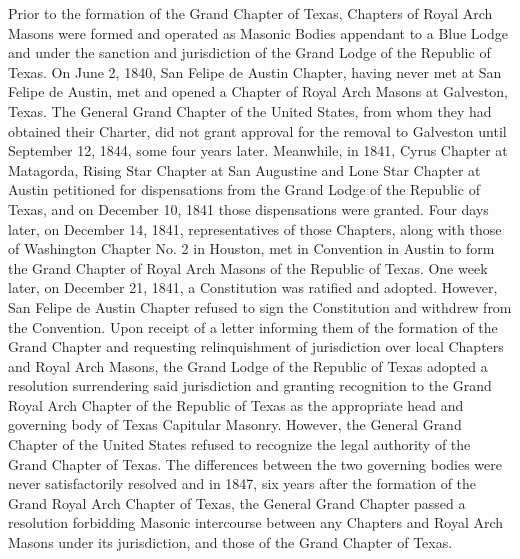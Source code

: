 \documentclass[letterpaper]{article}
\begin{document}
Prior to the formation of the Grand Chapter of Texas, Chapters of Royal Arch Masons were formed
and operated as Masonic Bodies appendant to a Blue Lodge and under the sanction and jurisdiction
of the Grand Lodge of the Republic of Texas. On June 2, 1840, San Felipe de Austin Chapter,
having never met at San Felipe de Austin, met and opened a Chapter of Royal Arch Masons at Galveston, Texas. The General Grand Chapter of the United States, from whom they had obtained
their Charter, did not grant approval for the removal to Galveston until September 12, 1844, some
four years later. Meanwhile, in 1841, Cyrus Chapter at Matagorda, Rising Star Chapter at San
Augustine and Lone Star Chapter at Austin petitioned for dispensations from the Grand Lodge
of the Republic of Texas, and on December 10, 1841 those dispensations were granted. Four days
later, on December 14, 1841, representatives of those Chapters, along with those of Washington
Chapter No. 2 in Houston, met in Convention in Austin to form the Grand Chapter of Royal
Arch Masons of the Republic of Texas. One week later, on December 21, 1841, a Constitution
was ratified and adopted. However, San Felipe de Austin Chapter refused to sign the Constitution
and withdrew from the Convention. Upon receipt of a letter informing them of the formation of
the Grand Chapter and requesting relinquishment of jurisdiction over local Chapters and Royal
Arch Masons, the Grand Lodge of the Republic of Texas adopted a resolution surrendering said
jurisdiction and granting recognition to the Grand Royal Arch Chapter of the Republic of Texas
as the appropriate head and governing body of Texas Capitular Masonry. However, the General
Grand Chapter of the United States refused to recognize the legal authority of the Grand Chapter
of Texas. The differences between the two governing bodies were never satisfactorily resolved and in
1847, six years after the formation of the Grand Royal Arch Chapter of Texas, the General Grand
Chapter passed a resolution forbidding Masonic intercourse between any Chapters and Royal Arch
Masons under its jurisdiction, and those of the Grand Chapter of Texas.
\end{document}
